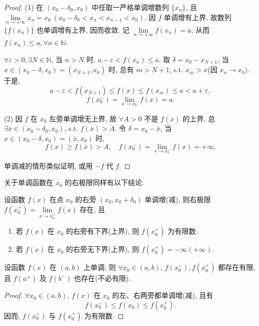 \begin{proof}
(1) 在 $(x_0 - \delta_0, x_0)$ 中任取一严格单调增数列 $\{x_n\}$, 且 $\lim\limits_{n \to +\infty} x_n = x_0\ (x_0 - \delta_0 < x_n < x_{n-1} < x_0)$. 因 $f$ 单调增有上界, 故数列 $\{f(x_n)\}$ 也单调增有上界, 因而收敛. 记 $\lim\limits_{n \to +\infty} f(x_n) = a$, 从而 $f(x_n) \leqslant a, \forall n \in \mathbb{N}$.

$\forall \varepsilon > 0, \exists N \in \mathbb{N}$, 当 $n > N$ 时, $a - \varepsilon < f(x_n) \leqslant a$. 取 $\delta = x_0 - x_{N+1}$, 当 $x \in (x_0 - \delta, x_0) = (x_{N+1}, x_0)$ 时, 总有 $m > N+1$, s.t. $x_m > x$(因 $x_n \to x_0$). 于是,
\[
a - \varepsilon < f(x_{N+1}) \leqslant f(x) \leqslant f(x_m) \leqslant a < a + \varepsilon,
\]
\[
f(x_0^-) = \lim_{x \to x_0^-} f(x) = a.
\]

(2) 因 $f$ 在 $x_0$ 左旁单调增无上界, 故 $\forall A > 0$ 不是 $f(x)$ 的上界, 总 $\exists \bar{x} \in (x_0 - \delta_0, x_0)$, s.t. $f(\bar{x}) > A$. 令 $\delta = x_0 - \bar{x}$, 当 $x \in (x_0 - \delta, x_0) = (\bar{x}, x_0)$ 时,
\[
f(x) \geqslant f(\bar{x}) > A,\quad f(x_0^-) = \lim_{x \to x_0^-} f(x) = +\infty.
\]

单调减的情形类似证明, 或用 $-f$ 代 $f$.
\end{proof}

关于单调函数在 $x_0$ 的右极限同样有以下结论.

\begin{lemma}\label{lem:2.4.2}
设函数 $f(x)$ 在点 $x_0$ 的右旁 $(x_0, x_0 + \delta_0)$ 单调增(减), 则右极限 $f(x_0^+) = \lim\limits_{x \to x_0^+} f(x)$ 存在, 且
\begin{enumerate}[label=(\arabic*)]
  \item 若 $f(x)$ 在 $x_0$ 的右旁有下界(上界), 则 $f(x_0^+)$ 为有限数;
  \item 若 $f(x)$ 在 $x_0$ 的右旁无下界(上界), 则 $f(x_0^+) = -\infty(+\infty)$.
\end{enumerate}
\end{lemma}

\begin{lemma}\label{lem:2.4.3}
设函数 $f(x)$ 在 $(a, b)$ 上单调, 则 $\forall x_0 \in (a, b)$, $f(x_0^-), f(x_0^+)$ 都存在有限, 且 $f(a^+)$ 及 $f(b^-)$ 也存在(不必有限).
\end{lemma}

\begin{proof}
$\forall x_0 \in (a, b)$, $f(x)$ 在 $x_0$ 的左、右两旁都单调增(减), 且有
\[
f(x_0^-) \leqslant f(x_0) \leqslant f(x_0^+).
\]
因而, $f(x_0^-)$ 与 $f(x_0^+)$ 为有限数.
\end{proof}

